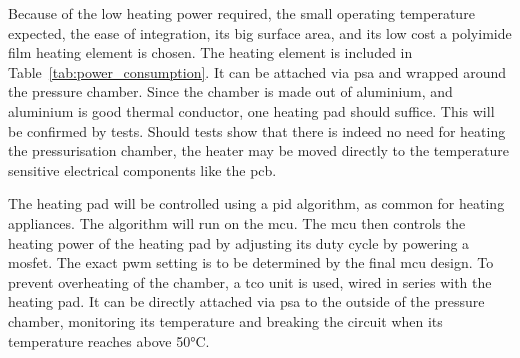 \documentclass[
  a4paper,
  11pt,
  openany,
  parskip,
  toc=totoc,
  listof=totoc,
  bibliography=totoc
]{scrreprt}
\newcommand{\tref}[1]{Table~\ref{#1}}
\begin{document}
Because of the low heating power required, the small operating temperature expected, the ease of integration, its big surface area, and its low cost a polyimide film heating element is chosen. The heating element is included in \tref{tab:power_consumption}. It can be attached via \gls{psa} and wrapped around the pressure chamber. Since the chamber is made out of aluminium, and aluminium is good thermal conductor, one heating pad should suffice. This will be confirmed by tests. Should tests show that there is indeed no need for heating the pressurisation chamber, the heater may be moved directly to the temperature sensitive electrical components like the \gls{pcb}.\par 

The heating pad will be controlled using a \gls{pid} algorithm, as common for heating appliances. The algorithm will run on the \gls{mcu}. The \gls{mcu} then controls the heating power of the heating pad by adjusting its duty cycle by powering a \gls{mosfet}. The exact \gls{pwm} setting is to be determined by the final \gls{mcu} design. To prevent overheating of the chamber, a \gls{tco} unit is used, wired in series with the heating pad. It can be directly attached via \gls{psa} to the outside of the pressure chamber, monitoring its temperature and breaking the circuit when its temperature reaches above 50°C.



\end{document}
